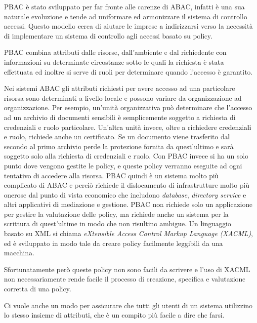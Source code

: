 PBAC è stato sviluppato per far fronte alle carenze di ABAC, infatti è una sua naturale evoluzione e tende ad uniformare ed armonizzare il sistema di controllo accessi.
Questo modello cerca di aiutare le imprese a indirizzarsi verso la necessità di implementare un sistema di controllo agli accessi basato su policy.\\ \par
PBAC combina attributi dalle risorse, dall'ambiente e dal richiedente con informazioni su determinate circostanze sotto le quali la richiesta è stata effettuata ed inoltre si serve di 
ruoli per determinare quando l'accesso è garantito.\\ \par
Nei sistemi ABAC gli attributi richiesti per avere accesso ad una particolare risorsa sono determinati a livello locale e possono variare da organizzazione ad organizzazione.
Per esempio, un'unità organizzativa può determinare che l'accesso ad un archivio di documenti sensibili è semplicemente soggetto a richiesta di credenziali e ruolo particolare.
Un'altra unità invece, oltre a richiedere credenziali e ruolo, richiede anche un certificato. Se un documento viene trasferito dal secondo al primo archivio perde la protezione fornita da quest'ultimo e sarà soggetto solo alla richiesta di credenziali e ruolo.
Con PBAC invece si ha un solo punto dove vengono gestite le policy, e queste policy verranno eseguite ad ogni tentativo di accedere alla risorsa.
PBAC quindi è un sistema molto più complicato di ABAC e perciò richiede il dislocamento di infrastrutture molto più onerose dal punto di vista economico che includono \textit{database}, \textit{directory service} e altri applicativi di mediazione e gestione.
PBAC non richiede solo un applicazione per gestire la valutazione delle policy, ma richiede anche un sistema per la scrittura di quest'ultime in modo che non risultino ambigue.
Un linguaggio basato su XML si chiama
 \textit{eXtensible Access Control Markup Language (XACML)}, ed è sviluppato in modo tale da creare policy facilmente leggibili da una macchina.\\ \par
Sfortunatamente però queste policy non sono facili da scrivere e l'uso di XACML non necessariamente rende facile il processo di creazione, specifica e valutazione corretta di una policy.\\ \par
Ci vuole anche un modo per assicurare che tutti gli utenti di un sistema utilizzino lo stesso insieme di attributi, che è un compito più facile a dire che farsi.
